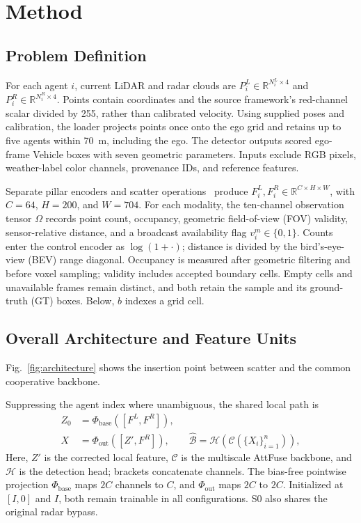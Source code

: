 \documentclass[conference]{IEEEtran}
\newcommand{\R}{\mathbb{R}}
\begin{document}
\section{Method}
\subsection{Problem Definition}
For each agent $i$, current LiDAR and radar clouds are $P_i^L\in\R^{N_i^L\times4}$ and $P_i^R\in\R^{N_i^R\times4}$. Points contain coordinates and the source framework's red-channel scalar divided by 255, rather than calibrated velocity. Using supplied poses and calibration, the loader projects points once onto the ego grid and retains up to five agents within 70~m, including the ego. The detector outputs scored ego-frame Vehicle boxes with seven geometric parameters. Inputs exclude RGB pixels, weather-label color channels, provenance IDs, and reference features.

Separate pillar encoders and scatter operations~\cite{pointpillars} produce $F_i^L,F_i^R\in\R^{C\times H\times W}$, with $C=64$, $H=200$, and $W=704$. For each modality, the ten-channel observation tensor $\Omega$ records point count, occupancy, geometric field-of-view (FOV) validity, sensor-relative distance, and a broadcast availability flag $v_i^m\in\{0,1\}$. Counts enter the control encoder as $\log(1+\cdot)$; distance is divided by the bird's-eye-view (BEV) range diagonal. Occupancy is measured after geometric filtering and before voxel sampling; validity includes accepted boundary cells. Empty cells and unavailable frames remain distinct, and both retain the sample and its ground-truth (GT) boxes. Below, $b$ indexes a grid cell.

\subsection{Overall Architecture and Feature Units}
Fig.~\ref{fig:architecture} shows the insertion point between scatter and the common cooperative backbone.


Suppressing the agent index where unambiguous, the shared local path is
\begin{align}
Z_0 &= \Phi_{\mathrm{base}}([F^L,F^R]), \label{eq:base}\\
X &= \Phi_{\mathrm{out}}([Z',F^R]),\qquad
\widehat{\mathcal B}=\mathcal H(\mathcal C(\{X_i\}_{i=1}^n)), \label{eq:shared}
\end{align}
Here, $Z'$ is the corrected local feature, $\mathcal C$ is the multiscale AttFuse backbone, and $\mathcal H$ is the detection head; brackets concatenate channels. The bias-free pointwise projection $\Phi_{\mathrm{base}}$ maps $2C$ channels to $C$, and $\Phi_{\mathrm{out}}$ maps $2C$ to $2C$. Initialized at $[I,0]$ and $I$, both remain trainable in all configurations. S0 also shares the original radar bypass.
\end{document}
